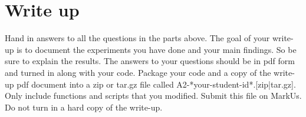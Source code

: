 \documentclass[12pt]{article}
\begin{document}





\section{Write up}

Hand in answers to all the questions in the parts above. The goal of your write-up is to document
the experiments you have done and your main findings. So be sure to explain the results.
The answers to your questions should be in pdf form and turned in along with your code. Package
your code and a copy of the write-up pdf document into a zip or tar.gz file called
A2-*your-student-id*.[zip|tar.gz]. Only include functions and scripts that you 
modified. Submit this file on MarkUs. Do not turn in a hard copy of the write-up.
\end{document}
